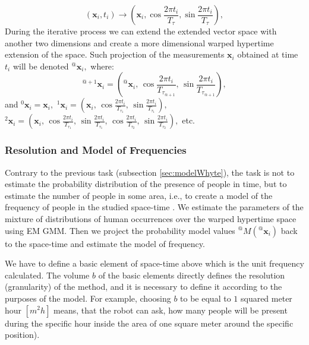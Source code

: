 \begin{equation}
\left(\mathbf{x}_i, t_i\right) \rightarrow \left(\mathbf{x}_i, \cos{\frac{2\pi t_{i}}{T_{\tau}}}, \sin{\frac{2\pi t_{i}}{T_{\tau}}}\right),
\end{equation}
%
During the iterative process we can extend the extended vector space with another two dimensions and create a more dimensional warped hypertime extension of the space. 
Such projection of the measurements $\mathbf{x}_i$ obtained at time $t_i$ will be denoted ${}^{@}\mathbf{x}_{i},$ where:
%
\begin{equation}\label{eqn:extensionWHyTeS}
    {}^{@+1}\mathbf{x}_{i} = \left({}^{@}\mathbf{x}_{i}, \,\cos{\frac{2\pi t_{i}}{T_{\tau_{@+1}}}}, \, \sin{\frac{2\pi t_{i}}{T_{\tau_{@+1}}}}\right),
\end{equation}
%
and ${}^{0}\mathbf{x}_{i} = \mathbf{x}_{i},$ ${}^{1}\mathbf{x}_{i} = \left(\mathbf{x}_{i}, \,\cos{\frac{2\pi t_{i}}{T_{\tau_1}}}, \, \sin{\frac{2\pi t_{i}}{T_{\tau_1}}}\right),$ ${}^{2}\mathbf{x}_{i} = \left(\mathbf{x}_{i}, \,\cos{\frac{2\pi t_{i}}{T_{\tau_1}}}, \, \sin{\frac{2\pi t_{i}}{T_{\tau_1}}}, \,\cos{\frac{2\pi t_{i}}{T_{\tau_2}}}, \, \sin{\frac{2\pi t_{i}}{T_{\tau_2}}}\right),$ etc.



\subsubsection{Resolution and Model of Frequencies}\label{sec:resolution}

Contrary to the previous task (subsection \ref{sec:modelWhyte}), the task is not to estimate the probability distribution of the presence of people in time, but to estimate the number of people in some area, i.e., to create a model of the frequency of people in the studied space-time \cite{Vintr2019Spatio}.
We estimate the parameters of the mixture of distributions of human occurrences over the warped hypertime space using EM GMM.
Then we project the probability model values ${}^{@}M({}^{@}\mathbf{x}_{i})$ back to the space-time and estimate the model of frequency.

We have to define a basic element of space-time above which is the unit frequency calculated. 
The volume $b$ of the basic elements directly defines the resolution (granularity) of the method, and it is necessary to define it according to the purposes of the model.
For example, choosing $b$ to be equal to $1$ squared meter hour $[m^{2}h]$ means, that the robot can ask, how many people will be present during the specific hour inside the area of one square meter around the specific position). 

